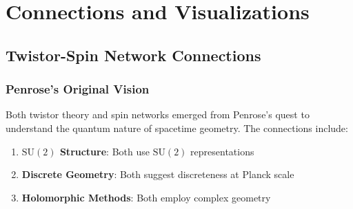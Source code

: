 \documentclass[11pt,a4paper,twoside]{book}
\theoremstyle{definition}
\newcommand{\SU}{\mathrm{SU}}
\begin{document}
\begin{visualbox}
\begin{center}
\end{center}
\end{visualbox}

\part{Connections and Visualizations}

\chapter{Twistor-Spin Network Connections}
\label{ch:connections}

\section{Penrose's Original Vision}

Both twistor theory and spin networks emerged from Penrose's quest to 
understand the quantum nature of spacetime geometry. The connections include:

\begin{enumerate}
    \item \textbf{$\SU(2)$ Structure}: Both use $\SU(2)$ representations
    \item \textbf{Discrete Geometry}: Both suggest discreteness at Planck scale
    \item \textbf{Holomorphic Methods}: Both employ complex geometry
\end{enumerate}
\end{document}
